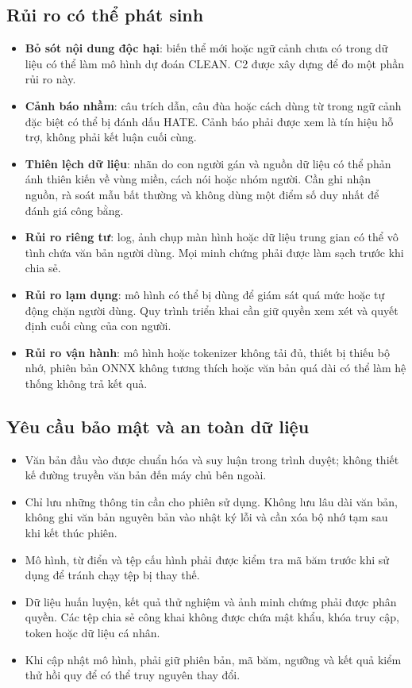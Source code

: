 \documentclass[12pt,a4paper]{article}
\begin{document}
\subsection{Rủi ro có thể phát sinh}
\begin{itemize}
  \item \textbf{Bỏ sót nội dung độc hại}: biến thể mới hoặc ngữ cảnh chưa có trong dữ liệu có thể làm mô hình dự đoán CLEAN. C2 được xây dựng để đo một phần rủi ro này.
  \item \textbf{Cảnh báo nhầm}: câu trích dẫn, câu đùa hoặc cách dùng từ trong ngữ cảnh đặc biệt có thể bị đánh dấu HATE. Cảnh báo phải được xem là tín hiệu hỗ trợ, không phải kết luận cuối cùng.
  \item \textbf{Thiên lệch dữ liệu}: nhãn do con người gán và nguồn dữ liệu có thể phản ánh thiên kiến về vùng miền, cách nói hoặc nhóm người. Cần ghi nhận nguồn, rà soát mẫu bất thường và không dùng một điểm số duy nhất để đánh giá công bằng.
  \item \textbf{Rủi ro riêng tư}: log, ảnh chụp màn hình hoặc dữ liệu trung gian có thể vô tình chứa văn bản người dùng. Mọi minh chứng phải được làm sạch trước khi chia sẻ.
  \item \textbf{Rủi ro lạm dụng}: mô hình có thể bị dùng để giám sát quá mức hoặc tự động chặn người dùng. Quy trình triển khai cần giữ quyền xem xét và quyết định cuối cùng của con người.
  \item \textbf{Rủi ro vận hành}: mô hình hoặc tokenizer không tải đủ, thiết bị thiếu bộ nhớ, phiên bản ONNX không tương thích hoặc văn bản quá dài có thể làm hệ thống không trả kết quả.
\end{itemize}

\subsection{Yêu cầu bảo mật và an toàn dữ liệu}
\begin{itemize}
  \item Văn bản đầu vào được chuẩn hóa và suy luận trong trình duyệt; không thiết kế đường truyền văn bản đến máy chủ bên ngoài.
  \item Chỉ lưu những thông tin cần cho phiên sử dụng. Không lưu lâu dài văn bản, không ghi văn bản nguyên bản vào nhật ký lỗi và cần xóa bộ nhớ tạm sau khi kết thúc phiên.
  \item Mô hình, từ điển và tệp cấu hình phải được kiểm tra mã băm trước khi sử dụng để tránh chạy tệp bị thay thế.
  \item Dữ liệu huấn luyện, kết quả thử nghiệm và ảnh minh chứng phải được phân quyền. Các tệp chia sẻ công khai không được chứa mật khẩu, khóa truy cập, token hoặc dữ liệu cá nhân.
  \item Khi cập nhật mô hình, phải giữ phiên bản, mã băm, ngưỡng và kết quả kiểm thử hồi quy để có thể truy nguyên thay đổi.
\end{itemize}
\end{document}
